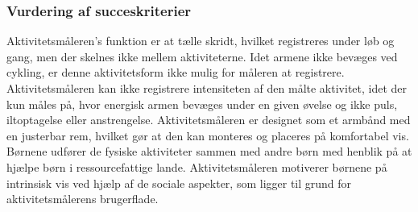 %

\subsubsection{Vurdering af succeskriterier}
Aktivitetsmåleren's funktion er at tælle skridt, hvilket registreres under løb og gang, men der skelnes ikke mellem aktiviteterne. Idet armene ikke bevæges ved cykling, er denne aktivitetsform ikke mulig for måleren at registrere. Aktivitetsmåleren kan ikke registrere intensiteten af den målte aktivitet, idet der kun måles på, hvor energisk armen bevæges under en given øvelse og ikke puls, iltoptagelse eller anstrengelse. %
Aktivitetsmåleren er designet som et armbånd med en justerbar rem, hvilket gør at den kan monteres og placeres på komfortabel vis. \citep{PowerManual2015} \newline
Børnene udfører de fysiske aktiviteter sammen med andre børn med henblik på at hjælpe børn i ressourcefattige lande. Aktivitetsmåleren motiverer børnene på intrinsisk vis ved hjælp af de sociale aspekter, som ligger til grund for aktivitetsmålerens brugerflade.%
~\citep{PowerAbout2015} 

